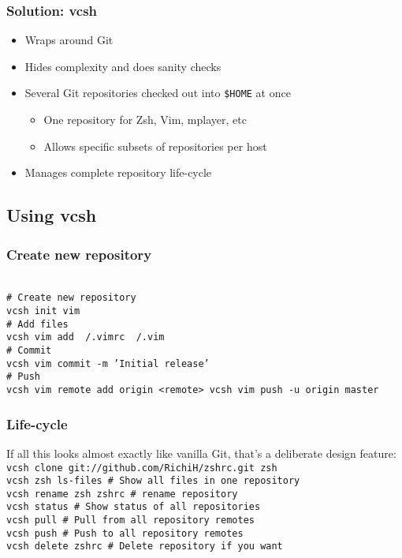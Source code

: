 \documentclass[t]{beamer}
\begin{document}
\begin{frame}
	\frametitle{Solution: vcsh}
	\begin{itemize}
		\item Wraps around Git
		\item Hides complexity and does sanity checks
		\item Several Git repositories checked out into \texttt{\$HOME} at once
		\begin{itemize}
			\item One repository for Zsh, Vim, mplayer, etc
			\item Allows specific subsets of repositories per host
		\end{itemize}
		\item Manages complete repository life-cycle
	\end{itemize}
\end{frame}

\subsection{Using vcsh}

\begin{frame}
	\frametitle{Create new repository}
	\texttt{ \\
		\# Create new repository \\
		vcsh init vim \\
		\# Add files \\
		vcsh vim add ~/.vimrc ~/.vim \\
		\# Commit \\
		vcsh vim commit -m 'Initial release' \\
		\# Push \\
		vcsh vim remote add origin <remote>
		vcsh vim push -u origin master
	}
\end{frame}

\begin{frame}
	\frametitle{Life-cycle}
	If all this looks almost exactly like vanilla Git, that's a deliberate design feature:
	\vfill
	\texttt{ \\
		vcsh clone git://github.com/RichiH/zshrc.git zsh \\
		vcsh zsh ls-files \# Show all files in one repository \\
		vcsh rename zsh zshrc \# rename repository \\
		vcsh status \# Show status of all repositories \\
		vcsh pull \# Pull from all repository remotes \\
		vcsh push \# Push to all repository remotes \\
		vcsh delete zshrc \# Delete repository if you want \\
	}
	\vfill
\end{frame}
\end{document}
